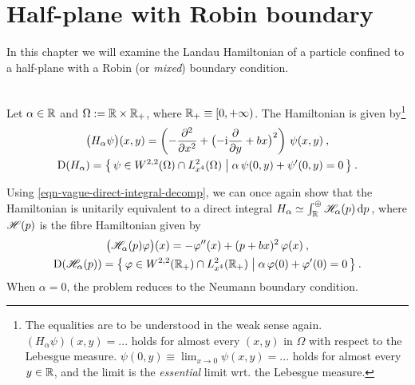 \chapter{Half-plane with Robin boundary} \label{chapter-robin}
In this chapter we will examine the Landau Hamiltonian of a particle confined to a half-plane with a Robin (or \textit{mixed}) boundary condition.
\begin{defn}
    \label{defn-hamiltonian-robin}
    \\
    Let $\alpha \in \mathbb{R}$ and $\Omega := \mathbb{R} \times \mathbb{R}_+$, where $\mathbb{R}_+ \equiv [0, +\infty)$. The Hamiltonian is given by\footnote{
    The equalities are to be understood in the weak sense again. $(H_\alpha \psi)(x, y) = ...$ holds for almost every $(x,y)$ in $\Omega$ with respect to the Lebesgue measure. $\psi(0,y) \equiv \lim_{x \to 0} \psi(x,y) = ...$ holds for almost every $y\in\mathbb{R}$, and the limit is the \textit{essential} limit wrt. the Lebesgue measure.
}
\begin{equation}
    \begin{gathered}
        \big( H_\alpha \psi \big)(x,y)
        = \left(
            -\frac{\partial ^2}{\partial x^2} +
            \big( {-\mathrm{i}} \frac{\partial }{\partial y} + bx \big)^2
        \right) \, \psi(x,y) \: ,
        \\
        \mathrm{D}(H_\alpha)
        = \big\{ \,
            \psi \in W^{2,2}(\Omega) \cap L^2_{x^4}(\Omega)
            \; \big| \;
            \alpha \, \psi(0,y) + \psi'(0,y) = 0
        \, \big\} \: .
    \end{gathered}
\end{equation}
\end{defn}
Using \eqref{eqn-vague-direct-integral-decomp}, we can once again show that the Hamiltonian is unitarily equivalent to a direct integral $H_\alpha \simeq \int^\oplus_{\mathbb{R}} \mathscr{H}_\alpha(p) \, \mathrm{d}p \,$, where $\mathscr{H}(p)$ is the fibre Hamiltonian given by
\begin{equation}
    \begin{gathered}
        \big( \mathscr{H}_\alpha(p) \varphi \big)(x)
        = -\varphi''(x) + (p + bx)^2 \, \varphi(x) \: ,
        \\
        \mathrm{D}( \mathscr{H}_\alpha(p) )
        = \big\{ \,
            \varphi \in W^{2,2}(\mathbb{R}_+) \cap L^2_{x^4}(\mathbb{R}_+)
            \; \big| \;
            \alpha \, \varphi(0) + \varphi'(0) = 0
        \, \big\} \: .
    \end{gathered}
\end{equation}
When $\alpha=0$, the problem reduces to the Neumann boundary condition.



